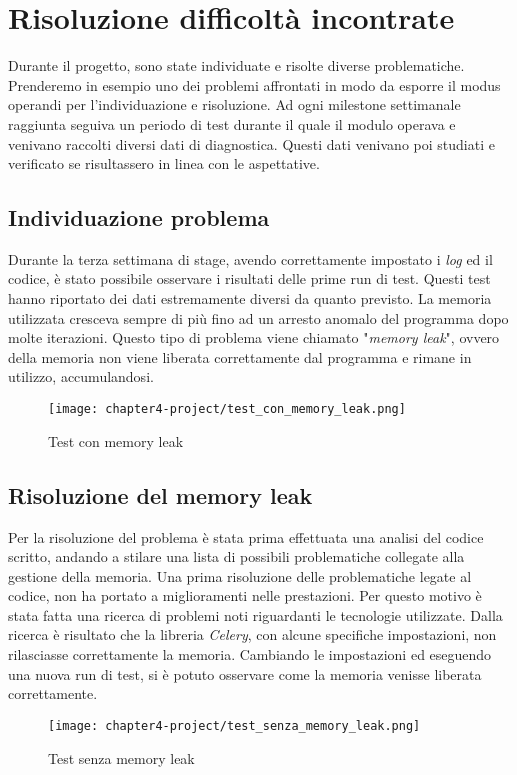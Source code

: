 \section{Risoluzione difficoltà incontrate}

Durante il progetto, sono state individuate e risolte diverse problematiche. Prenderemo in esempio uno dei problemi affrontati in modo da esporre il modus operandi per l'individuazione e risoluzione.
Ad ogni milestone settimanale raggiunta seguiva un periodo di test durante il quale il modulo operava e venivano raccolti diversi dati di diagnostica. Questi dati venivano poi studiati e verificato se risultassero in linea con le aspettative.

\subsection{Individuazione problema}
Durante la terza settimana di stage, avendo correttamente impostato i \emph{log} ed il codice, è stato possibile osservare i risultati delle prime run di test. Questi test hanno riportato dei dati estremamente diversi da quanto previsto. La memoria utilizzata cresceva sempre di più fino ad un arresto anomalo del programma dopo molte iterazioni. Questo tipo di problema viene chiamato "\emph{memory leak}", ovvero della memoria non viene liberata correttamente dal programma e rimane in utilizzo, accumulandosi.

\begin{figure}[!h] 
    \centering 
    \texttt{[image: chapter4-project/test\_con\_memory\_leak.png]} 
    \caption{Test con memory leak}
\end{figure}
\newpage{}
\subsection{Risoluzione del memory leak}

Per la risoluzione del problema è stata prima effettuata una analisi del codice scritto, andando a stilare una lista di possibili problematiche collegate alla gestione della memoria. Una prima risoluzione delle problematiche legate al codice, non ha portato a miglioramenti nelle prestazioni. Per questo motivo è stata fatta una ricerca di problemi noti riguardanti le tecnologie utilizzate. Dalla ricerca è risultato che la libreria \emph{Celery}, con alcune specifiche impostazioni, non rilasciasse correttamente la memoria. Cambiando le impostazioni ed eseguendo una nuova run di test, si è potuto osservare come la memoria venisse liberata correttamente.

\begin{figure}[!h] 
    \centering 
    \texttt{[image: chapter4-project/test\_senza\_memory\_leak.png]} 
    \caption{Test senza memory leak}
\end{figure}